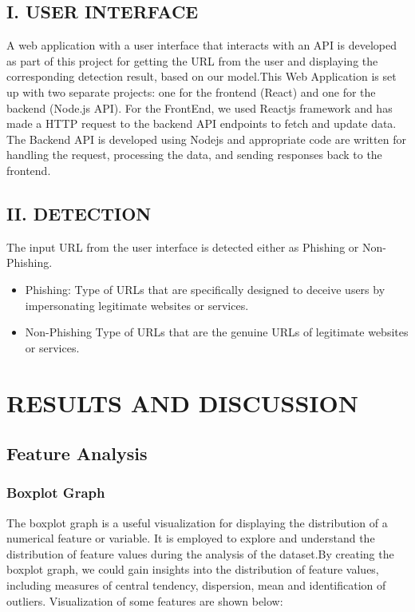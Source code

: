 \documentclass[conference]{IEEEtran}
\begin{document}
\subsection*{I. {\footnotesize USER INTERFACE}}
\par  A web application with a user interface that interacts with an API is developed as part of this project for getting the URL from the user and displaying the corresponding detection result, based on our model.This Web Application is set up with two separate projects: one for the frontend (React) and one for the backend (Node.js API). For the FrontEnd, we used Reactjs framework and has made a HTTP request to the backend API endpoints to fetch and update data. The Backend API is developed using Nodejs and appropriate code are written for handling the request, processing the data, and sending responses back to the frontend.
\subsection*{II. {\footnotesize DETECTION}}
\par The input URL from the user interface is detected either as Phishing or Non-Phishing.
\begin{itemize}
    \item Phishing: Type of URLs that are specifically designed to deceive users by impersonating legitimate websites or services.
    \item Non-Phishing Type of URLs that are the genuine URLs of legitimate websites or services.
\end{itemize}


\section{RESULTS AND DISCUSSION}

\subsection{Feature Analysis}
\subsubsection*{Boxplot Graph}
\par The boxplot graph is a useful visualization for displaying the distribution of a numerical feature or variable. It is employed to explore and understand the distribution of feature values during the analysis of the dataset.By creating the boxplot graph, we could gain insights into the distribution of feature values, including measures of central tendency, dispersion, mean and identification of outliers. Visualization of some features are shown below:
\end{document}
